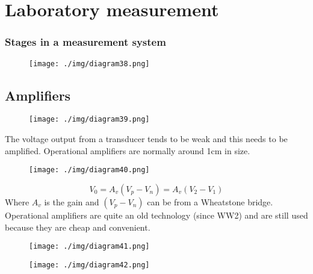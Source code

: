 \chapter{Laboratory measurement}
\subsection*{Stages in a measurement system}
\begin{figure}[H]
  \centering
  \texttt{[image: ./img/diagram38.png]}
\end{figure}
\section{Amplifiers}
\begin{figure}[H]
  \centering
  \texttt{[image: ./img/diagram39.png]}
\end{figure}
The voltage output from a transducer tends to be weak and this needs to be amplified. Operational amplifiers are normally around 1\si{\centi\meter} in size.
\begin{figure}[H]
  \centering
  \texttt{[image: ./img/diagram40.png]}
\end{figure}
\begin{equation}
  V_0 = A_v (V_p - V_n) = A_v (V_2 - V_1)
\end{equation}
Where $A_v$ is the gain and $(V_p - V_n)$ can be from a Wheatstone bridge. Operational amplifiers are quite an old technology (since WW2) and are still used because they are cheap and convenient.
\begin{figure}[H]
  \centering
  \texttt{[image: ./img/diagram41.png]}
\end{figure}
\begin{figure}[H]
  \centering
  \texttt{[image: ./img/diagram42.png]}
\end{figure}
